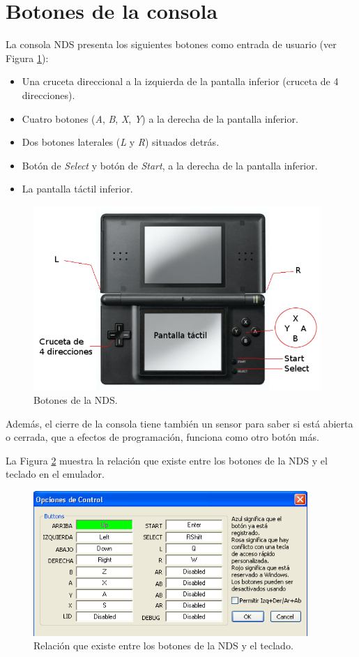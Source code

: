 \section{Botones de la consola}
La consola NDS presenta los siguientes botones como entrada de usuario (ver Figura \ref{fig_c3_botones}):
\begin{itemize}
\item Una cruceta direccional a la izquierda de la pantalla inferior (cruceta de 4 direcciones).
%
\item Cuatro botones (\textit{A}, \textit{B}, \textit{X}, \textit{Y}) a la derecha de la pantalla inferior.
%
\item Dos botones laterales (\textit{L} y \textit{R}) situados detrás.
%
\item Botón de \textit{Select} y botón de \textit{Start}, a la derecha de la pantalla inferior.
%
\item La pantalla táctil inferior.
\end{itemize}

\begin{figure}[t]
\centering
\includegraphics[height=7cm]{Figuras/C3/c3_botones.png}
\caption{Botones de la NDS.}
\label{fig_c3_botones}
\end{figure}

Además, el cierre de la consola tiene también un sensor para saber si está abierta o cerrada, que a efectos de programación, funciona como otro botón más.

La Figura \ref{fig_c3_botones_teclass} muestra la relación que existe entre los botones de la NDS y el teclado en el emulador.

\begin{figure}[t]
\centering
\includegraphics[height=5.5cm]{Figuras/C3/c3_botones_teclas.png}
\caption{Relación que existe entre los botones de la NDS y el teclado.}
\label{fig_c3_botones_teclass}
\end{figure}

